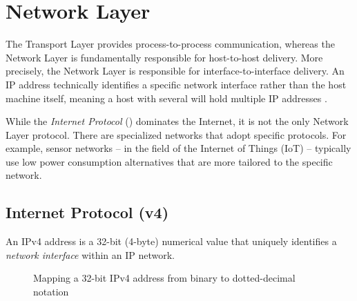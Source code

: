 \chapter{Network Layer}

The Transport Layer provides process-to-process communication, whereas the Network Layer is fundamentally responsible for host-to-host delivery. 
More precisely, the Network Layer is responsible for interface-to-interface delivery. An IP address technically identifies a specific network interface rather than the host machine itself, meaning a host with several  will hold multiple IP addresses \cite{rfc791}.

While the \emph{Internet Protocol} () dominates the Internet, it is not the only Network Layer protocol.
There are specialized networks that adopt specific protocols. For example, sensor networks -- in the field of the Internet of Things (IoT) -- typically use low power consumption alternatives that are more tailored to the specific network.

\section{Internet Protocol (v4)}
An IPv4 address is a 32-bit (4-byte) numerical value that uniquely identifies a \emph{network interface} within an IP network. 

\begin{figure}[htbp]
    \centering
    \caption{Mapping a 32-bit IPv4 address from binary to dotted-decimal notation}
    \label{fig:ipv4_decimal_map}
\end{figure}

